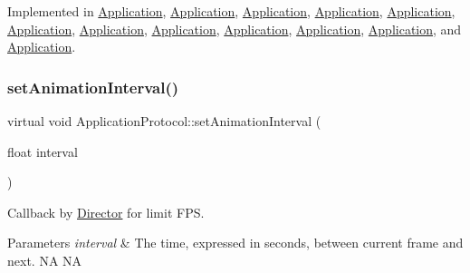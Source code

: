 Implemented in \hyperlink{classApplication_a13ccf5ab932de8a22255b56d085bed59}{Application}, \hyperlink{classApplication_a13ccf5ab932de8a22255b56d085bed59}{Application}, \hyperlink{classApplication_a13ccf5ab932de8a22255b56d085bed59}{Application}, \hyperlink{classApplication_a13ccf5ab932de8a22255b56d085bed59}{Application}, \hyperlink{classApplication_a13ccf5ab932de8a22255b56d085bed59}{Application}, \hyperlink{classApplication_a7efe73e7593e558749052d9decedf693}{Application}, \hyperlink{classApplication_a13ccf5ab932de8a22255b56d085bed59}{Application}, \hyperlink{classApplication_a72b67fcc1ab0875ee67a95167c76db61}{Application}, \hyperlink{classApplication_ab77675704c2cec7b0ed8413f4d556562}{Application}, \hyperlink{classApplication_a13ccf5ab932de8a22255b56d085bed59}{Application}, \hyperlink{classApplication_a72b67fcc1ab0875ee67a95167c76db61}{Application}, and \hyperlink{classApplication_a72b67fcc1ab0875ee67a95167c76db61}{Application}.

\mbox{\label{classApplicationProtocol_ac69ac0f01aaba7cc8654ec7cce4eb88f}} 
\subsubsection{\texorpdfstring{set\+Animation\+Interval()}{setAnimationInterval()}\hspace{0.1cm}{\footnotesize\ttfamily [1/2]}}
{\footnotesize\ttfamily virtual void Application\+Protocol\+::set\+Animation\+Interval (\begin{DoxyParamCaption}\item[{float}]{interval }\end{DoxyParamCaption})\hspace{0.3cm}{\ttfamily [pure virtual]}}



Callback by \hyperlink{classDirector}{Director} for limit F\+PS. 


\begin{DoxyParams}{Parameters}
{\em interval} & The time, expressed in seconds, between current frame and next.  NA  NA \\
\hline
\end{DoxyParams}


